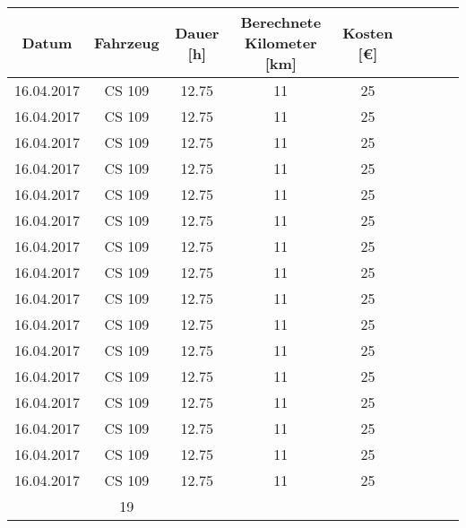 \documentclass[
	pagenumber=false, %
	parskip=half, %
	fromalign=right, %
	foldmarks=true, %
	addrfield=true %
	firstfoot=on %
    ]{scrlttr2}
\begin{document}
\begin{tabular}{ | c | c | c | c | c | c | c | c | c | }
\hline
Datum & Fahrzeug & Dauer [h] & Berechnete Kilometer [km]& Kosten [\euro{}]\\ \hline
16.04.2017 & CS 109 & 12.75 & 11 & 25 \\ 
16.04.2017 & CS 109 & 12.75 & 11 & 25 \\ 
16.04.2017 & CS 109 & 12.75 & 11 & 25 \\ 
16.04.2017 & CS 109 & 12.75 & 11 & 25 \\ 
16.04.2017 & CS 109 & 12.75 & 11 & 25 \\ 
16.04.2017 & CS 109 & 12.75 & 11 & 25 \\ 
16.04.2017 & CS 109 & 12.75 & 11 & 25 \\ 
16.04.2017 & CS 109 & 12.75 & 11 & 25 \\ 
16.04.2017 & CS 109 & 12.75 & 11 & 25 \\ 
16.04.2017 & CS 109 & 12.75 & 11 & 25 \\ 
16.04.2017 & CS 109 & 12.75 & 11 & 25 \\ 
16.04.2017 & CS 109 & 12.75 & 11 & 25 \\ 
16.04.2017 & CS 109 & 12.75 & 11 & 25 \\ 
16.04.2017 & CS 109 & 12.75 & 11 & 25 \\ 
16.04.2017 & CS 109 & 12.75 & 11 & 25 \\ 
16.04.2017 & CS 109 & 12.75 & 11 & 25 \\ 
\hhline{|-|-|-|-|=|}
\multicolumn{4}{|r|}{Summe:} &19\\\hline
\end{tabular}
\end{document}
